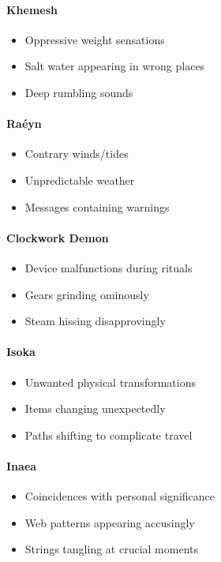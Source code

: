\documentclass[12pt,twoside]{book}
\begin{document}
\paragraph{Khemesh}
\begin{itemize}
\item Oppressive weight sensations
\item Salt water appearing in wrong places
\item Deep rumbling sounds
\end{itemize}

\paragraph{Raéyn}
\begin{itemize}
\item Contrary winds/tides
\item Unpredictable weather
\item Messages containing warnings
\end{itemize}

\paragraph{Clockwork Demon}
\begin{itemize}
\item Device malfunctions during rituals
\item Gears grinding ominously
\item Steam hissing disapprovingly
\end{itemize}

\paragraph{Isoka}
\begin{itemize}
\item Unwanted physical transformations
\item Items changing unexpectedly
\item Paths shifting to complicate travel
\end{itemize}

\paragraph{Inaea}
\begin{itemize}
\item Coincidences with personal significance
\item Web patterns appearing accusingly
\item Strings tangling at crucial moments
\end{itemize}
\end{document}
